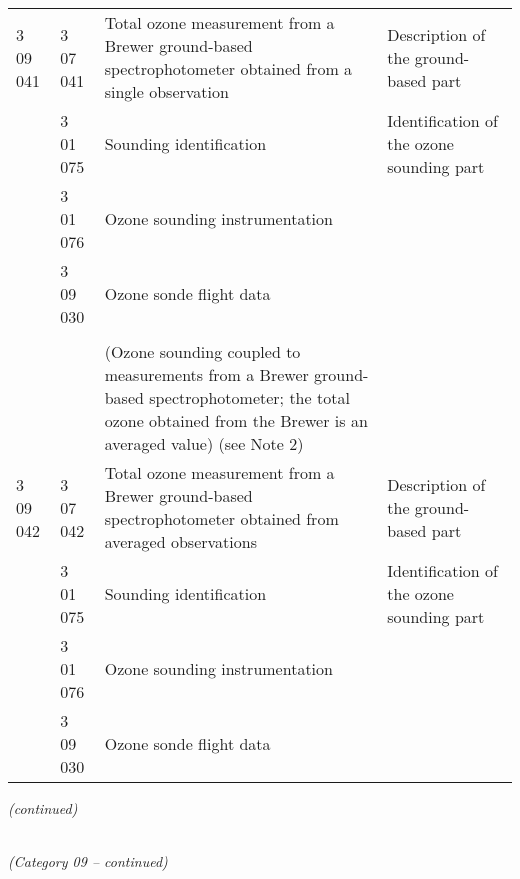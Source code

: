 \begin{longtable}[]{@{}llll@{}}
3 09 041 & 3 07 041 & Total ozone measurement from a Brewer ground-based spectrophotometer obtained from a single observation & Description of the ground-based part\tabularnewline
& 3 01 075 & Sounding identification & Identification of the ozone sounding part\tabularnewline
& 3 01 076 & Ozone sounding instrumentation &\tabularnewline
& 3 09 030 & Ozone sonde flight data &\tabularnewline
& & &\tabularnewline
& & (Ozone sounding coupled to measurements from a Brewer ground-based spectrophotometer; the total ozone obtained from the Brewer is an averaged value) (see Note 2) &\tabularnewline
3 09 042 & 3 07 042 & Total ozone measurement from a Brewer ground-based spectrophotometer obtained from averaged observations & Description of the ground-based part\tabularnewline
& 3 01 075 & Sounding identification & Identification of the ozone sounding part\tabularnewline
& 3 01 076 & Ozone sounding instrumentation &\tabularnewline
& 3 09 030 & Ozone sonde flight data &\tabularnewline
\bottomrule
\end{longtable}

\emph{(continued)}

\emph{\\
(Category 09 -- continued)}


